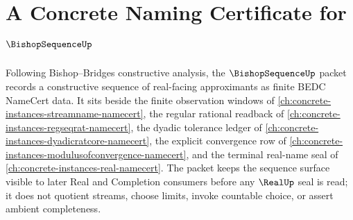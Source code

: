 \chapter{A Concrete Naming Certificate for $\BishopSequenceUp$}
\label{ch:concrete-instances-bishop-sequence-namecert}

Following Bishop--Bridges constructive analysis, the $\BishopSequenceUp$ packet records a constructive sequence of real-facing approximants as finite BEDC NameCert data. It sits beside the finite observation windows of \autoref{ch:concrete-instances-streamname-namecert}, the regular rational readback of \autoref{ch:concrete-instances-regseqrat-namecert}, the dyadic tolerance ledger of \autoref{ch:concrete-instances-dyadicratcore-namecert}, the explicit convergence row of \autoref{ch:concrete-instances-modulusofconvergence-namecert}, and the terminal real-name seal of \autoref{ch:concrete-instances-real-namecert}. The packet keeps the sequence surface visible to later Real and Completion consumers before any $\RealUp$ seal is read; it does not quotient streams, choose limits, invoke countable choice, or assert ambient completeness.

